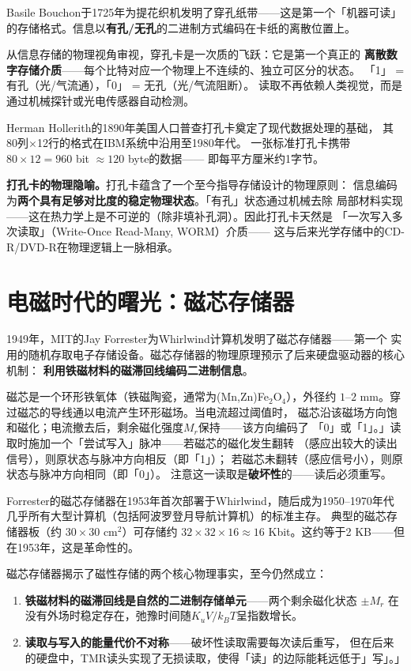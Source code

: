 \documentclass[11pt,a4paper,openany]{book}
\theoremstyle{definition}
\theoremstyle{plain}
\theoremstyle{remark}
\begin{document}
Basile Bouchon于1725年为提花织机发明了穿孔纸带——这是第一个「机器可读」
的存储格式。信息以\textbf{有孔/无孔}的二进制方式编码在卡纸的离散位置上。

从信息存储的物理视角审视，穿孔卡是一次质的飞跃：它是第一个真正的
\textbf{离散数字存储介质}——每个比特对应一个物理上不连续的、独立可区分的状态。
「1」 = 有孔（光/气流通），「0」 = 无孔（光/气流阻断）。
读取不再依赖人类视觉，而是通过机械探针或光电传感器自动检测。

Herman Hollerith的1890年美国人口普查打孔卡奠定了现代数据处理的基础，
其80列$\times$12行的格式在IBM系统中沿用至1980年代。
一张标准打孔卡携带 $80 \times 12 = 960$ bit $\approx 120$ byte的数据——
即每平方厘米约1字节。

\begin{histbox}
\textbf{打孔卡的物理隐喻。}打孔卡蕴含了一个至今指导存储设计的物理原则：
信息编码为\textbf{两个具有足够对比度的稳定物理状态}。「有孔」状态通过机械去除
局部材料实现——这在热力学上是不可逆的（除非填补孔洞）。因此打孔卡天然是
「一次写入多次读取」（Write-Once Read-Many, WORM）介质——
这与后来光学存储中的CD-R/DVD-R在物理逻辑上一脉相承。
\end{histbox}

\section{电磁时代的曙光：磁芯存储器}

1949年，MIT的Jay Forrester为Whirlwind计算机发明了磁芯存储器——第一个
实用的随机存取电子存储设备。磁芯存储器的物理原理预示了后来硬盘驱动器的核心机制：
\textbf{利用铁磁材料的磁滞回线编码二进制信息}。

磁芯是一个环形铁氧体（铁磁陶瓷，通常为(Mn,Zn)Fe$_2$O$_4$），外径约
$1$--$2$ mm。穿过磁芯的导线通以电流产生环形磁场。当电流超过阈值时，
磁芯沿该磁场方向饱和磁化；电流撤去后，剩余磁化强度$M_r$保持——该方向编码了
「0」或「1」。」读取时施加一个「尝试写入」脉冲——若磁芯的磁化发生翻转
（感应出较大的读出信号），则原状态与脉冲方向相反（即「1」）；
若磁芯未翻转（感应信号小），则原状态与脉冲方向相同（即「0」）。
注意这一读取是\textbf{破坏性}的——读后必须重写。

Forrester的磁芯存储器在1953年首次部署于Whirlwind，随后成为1950--1970年代
几乎所有大型计算机（包括阿波罗登月导航计算机）的标准主存。
典型的磁芯存储器板（约 $30 \times 30$ cm$^2$）可存储约 $32 \times 32 \times 16
\approx 16$ Kbit。这约等于2 KB——但在1953年，这是革命性的。

磁芯存储器揭示了磁性存储的两个核心物理事实，至今仍然成立：
\begin{enumerate}
  \item \textbf{铁磁材料的磁滞回线是自然的二进制存储单元}——两个剩余磁化状态
  $\pm M_r$ 在没有外场时稳定存在，弛豫时间随$K_u V/k_B T$呈指数增长。
  \item \textbf{读取与写入的能量代价不对称}——破坏性读取需要每次读后重写，
  但在后来的硬盘中，TMR读头实现了无损读取，使得「读」的边际能耗远低于」写」。」
\end{enumerate}
\end{document}
